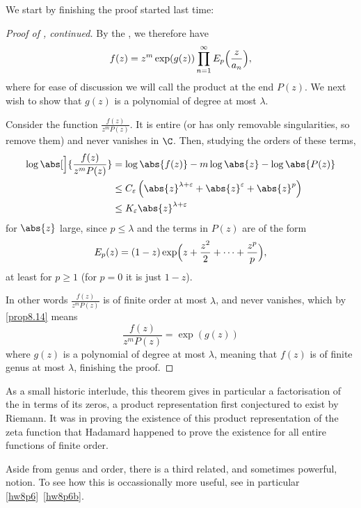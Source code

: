 


We start by finishing the proof started last time:

\begin{proof}[Proof of , continued]
	By the , we therefore have
	\[
		f(z) = z^m \exp(g(z)) \prod_{n = 1}^\infty E_p\Bigl( \frac{z}{a_n} \Bigr),
	\]
	where for ease of discussion we will call the product at the end $P(z)$.
	We next wish to show that $g(z)$ is a polynomial of degree at most $\lambda$.

	Consider the function $\frac{f(z)}{z^m P(z)}$.
	It is entire (or has only removable singularities, so remove them) and never vanishes in $\C$.
	Then, studying the orders of these terms,
	\begin{align*}
		\log \abs[\Big]{\frac{f(z)}{z^m P(z)}} &= \log \abs{f(z)} - m \log\abs{z} - \log \abs{P(z)} \\
		&\leq C_\varepsilon \left ( \abs{z}^{\lambda + \varepsilon} + \abs{z}^\varepsilon + \abs{z}^p \right ) \\
		&\leq K_\varepsilon \abs{z}^{\lambda + \varepsilon}
	\end{align*}
	for $\abs{z}$ large, since $p \leq \lambda$ and the terms in $P(z)$ are of the form
	\[
		E_p(z) = (1 - z) \exp\Bigl( z + \frac{z^2}{2} + \dots + \frac{z^p}{p} \Bigr),
	\]
	at least for $p \geq 1$ (for $p = 0$ it is just $1 - z$).

	In other words $\frac{f(z)}{z^m P(z)}$ is of finite order at most $\lambda$, and never vanishes, which by \autoref{prop8.14} means
	\[
		\frac{f(z)}{z^m P(z)} = \exp(g(z))
	\]
	where $g(z)$ is a polynomial of degree at most $\lambda$, meaning that $f(z)$ is of finite genus at most $\lambda$, finishing the proof.
\end{proof}

As a small historic interlude, this theorem gives in particular a factorisation of the  in terms of its zeros, a product representation first conjectured to exist by Riemann.
It was in proving the existence of this product representation of the zeta function that Hadamard happened to prove the existence for all entire functions of finite order.

Aside from genus and order, there is a third related, and sometimes powerful, notion.
To see how this is occassionally more useful, see in particular \autoref{hw8p6}~\ref{hw8p6b}.

